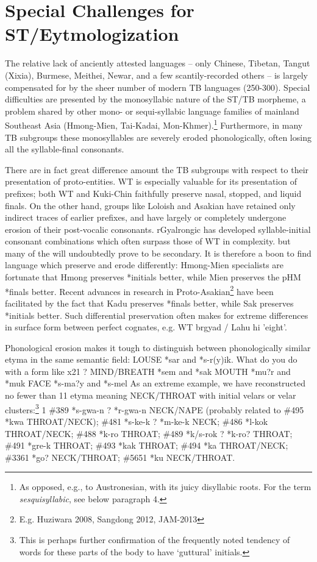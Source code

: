 \section{Special Challenges for ST/Eytmologization}

The relative lack of anciently attested languages -- only Chinese, Tibetan, Tangut (Xixia), Burmese, Meithei, Newar, and a few scantily-recorded others -- is largely compensated for by the sheer number of modern TB languages (250-300).  Special difficulties are presented by the monosyllabic nature of the ST/TB morpheme, a problem shared by other mono- or sequi-syllabic language families of mainland Southeast Asia (Hmong-Mien, Tai-Kadai, Mon-Khmer).\footnote{As opposed, e.g., to Austronesian, with its juicy disyllabic roots. For the term \textit{sesquisyllabic}, see below paragraph 4.}
Furthermore, in many TB subgroups these monosyllables are severely eroded phonologically, often losing all the syllable-final consonants.

There are in fact great difference amount the TB subgroups with respect to their presentation of proto-entities.  WT is especially valuable for its presentation of prefixes; both WT and Kuki-Chin faithfully preserve nasal, stopped, and liquid finals.  On the other hand, groups like Loloish and Asakian have retained only indirect traces of earlier prefixes, and have largely or completely undergone erosion of their post-vocalic consonants.
rGyalrongic has developed syllable-initial consonant combinations which often surpass those of WT in complexity. but many of the will undoubtedly prove to be secondary.
It is therefore a boon to find language which preserve and erode differently: Hmong-Mien specialists are fortunate that Hmong preserves *initials better, while Mien preserves the pHM *finals better.
Recent advances in research in Proto-Asakian\footnote{E.g. Huziwara 2008, Sangdong 2012, JAM-2013} have been facilitated by the fact that Kadu preserves *finals better, while Sak preserves *initials better.
Such differential preservation often makes for extreme differences in surface form between perfect cognates, e.g. WT brgyad / Lahu hi 'eight'.

Phonological erosion makes it tough to distinguish between phonologically similar etyma in the same semantic field:
		LOUSE *sar and *s-r(y)ik. What do you do with a form like x21 ?
		MIND/BREATH *sem and *sak
		MOUTH *mu?r and *muk
		FACE *s-ma?y and *s-mel
As an extreme example, we have reconstructed no fewer than 11 etyma meaning NECK/THROAT with initial velars or velar clusters:\footnote{This is perhaps further confirmation of the frequently noted tendency of words for these parts of the body to have ‘guttural’ initials.} 1 \#389 *s-gwa-n ? *r-gwa-n NECK/NAPE (probably related to \#495 *kwa THROAT/NECK); \#481 *s-ke-k ? *m-ke-k NECK; \#486 *l-kok THROAT/NECK; \#488 *k-ro THROAT; \#489 *k/s-rok ? *k-ro? THROAT; \#491 *gre-k THROAT; \#493 *kak THROAT; \#494 *ka THROAT/NECK; \#3361 *go? NECK/THROAT; \#5651 *ku NECK/THROAT.

